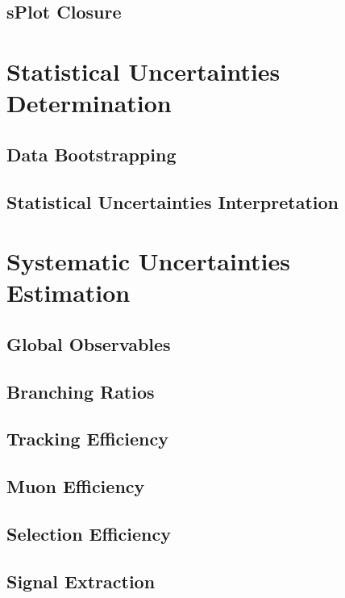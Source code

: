 \subsection{sPlot Closure}


\section{Statistical Uncertainties Determination} 

\subsection{Data Bootstrapping}

\subsection{Statistical Uncertainties Interpretation}

\section{Systematic Uncertainties Estimation} 

\subsection{Global Observables}

\subsection{Branching Ratios}

\subsection{Tracking Efficiency}

\subsection{Muon Efficiency}

\subsection{Selection Efficiency}

\subsection{Signal Extraction}

